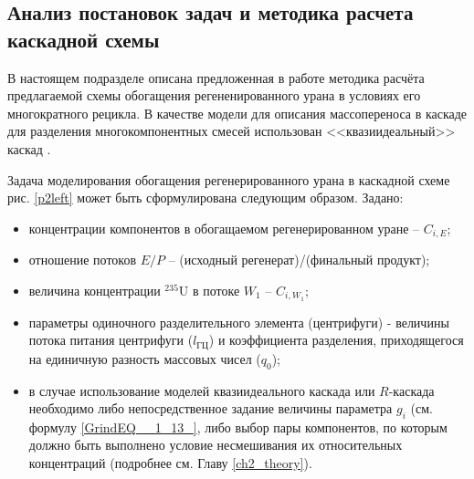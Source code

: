 
\subsection{Анализ постановок задач и методика расчета каскадной схемы}\label{statement}

В настоящем подразделе описана предложенная в работе методика расчёта предлагаемой схемы обогащения регененированного урана в условиях его многократного рецикла. В качестве модели для описания массопереноса в каскаде для разделения многокомпонентных смесей использован <<квазиидеальный>> каскад \cite{sazykinKvaziidealnyeKaskadyDlya2000}. 

Задача моделирования обогащения регенерированного урана в каскадной схеме рис. \ref{p2left} может быть сформулирована следующим образом.
Задано:

\begin{itemize}
    \item концентрации компонентов в обогащаемом регенерированном уране -- $C_{i,{E}}$; 
    \item отношение потоков $E/P$ -- (исходный регенерат)/(финальный продукт);
    \item величина концентрации $^{235}$U в потоке $W_{1}$ -- $C_{i,{W_1}}$;
    \item параметры одиночного разделительного элемента (центрифуги) - величины потока питания центрифуги ($l_{ГЦ}$) и коэффициента разделения, приходящегося на единичную разность массовых чисел ($q_{0}$);
    \item в случае использование моделей квазиидеального каскада или $R$-каскада необходимо либо непосредственное задание величины параметра $g_i$ (см. формулу \ref{GrindEQ__1_13_}, либо выбор пары компонентов, по которым должно быть выполнено условие несмешивания их относительных концентраций (подробнее см. Главу \ref{ch2_theory}).
\end{itemize}

